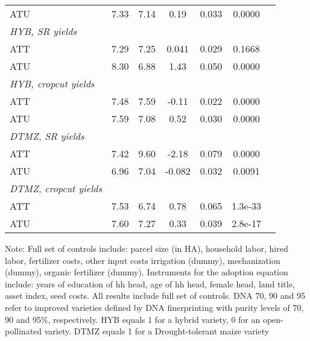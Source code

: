 \begin{table}[H]
\begin{threeparttable}
\begin{tabular}{l cccccc}
%
%
%
ATU         &        7.33&        7.14&        0.19&       0.033&      0.0000\\
%
%
%
\textit{HYB, SR yields}&            &            &            &            &            \\
ATT         &        7.29&        7.25&       0.041&       0.029&      0.1668\\
%
%
%
ATU         &        8.30&        6.88&        1.43&       0.050&      0.0000\\
%
%
%
\textit{HYB, cropcut yields}&            &            &            &            &            \\
ATT         &        7.48&        7.59&       -0.11&       0.022&      0.0000\\
%
%
%
ATU         &        7.59&        7.08&        0.52&       0.030&      0.0000\\
%
%
%
\textit{DTMZ, SR yields}&            &            &            &            &            \\
ATT         &        7.42&        9.60&       -2.18&       0.079&      0.0000\\
%
%
%
ATU         &        6.96&        7.04&      -0.082&       0.032&      0.0091\\
%
%
%
\textit{DTMZ, cropcut yields}&            &            &            &            &            \\
ATT         &        7.53&        6.74&        0.78&       0.065&     1.3e-33\\
%
%
%
ATU         &        7.60&        7.27&        0.33&       0.039&     2.8e-17\\
\hline
\hline
\end{tabular}
\begin{tablenotes}
\footnotesize
\item{Note: Full set of controls include: parcel size (in HA), household labor, hired labor, fertilizer costs, other input costs irrigation (dummy), mechanization (dummy), organic fertilizer (dummy). Instruments for the adoption equation include: years of education of hh head, age of hh head, female head, land title, asset index, seed costs. All results include full set of controls. DNA 70, 90 and 95 refer to improved varieties defined by DNA finerprinting with purity levels of 70, 90 and 95\%, respectively. HYB equals 1 for a hybrid variety, 0 for an open-pollinated variety. DTMZ equals 1 for a Drought-tolerant maize variety}
\end{tablenotes}
\end{threeparttable}
\end{table}
